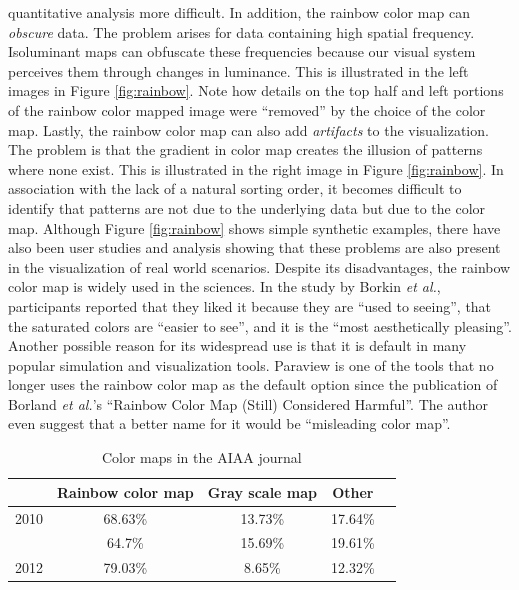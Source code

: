 quantitative analysis more difficult\cite{Borland:2007:RCM:1251554.1251614}.  
%
In addition, the rainbow color map can \emph{obscure} data. The problem arises 
for data containing high spatial frequency. Isoluminant maps can obfuscate these frequencies 
because our visual system perceives them through changes in luminance. 
%
This is illustrated in the left images in Figure \ref{fig:rainbow}.
%
Note how details on the top half and left portions of the rainbow color mapped image  were ``removed'' by the choice of the color map.
%
Lastly, the rainbow color map can also add \emph{artifacts} to the visualization\cite{treinishshould}. 
The problem is that the gradient in color map creates the illusion of patterns where none exist. This 
is illustrated in the right image in Figure \ref{fig:rainbow}. In association with the lack of a natural sorting order, 
it becomes difficult to identify that patterns are not due to the underlying data but due to the color map. 
%
Although Figure \ref{fig:rainbow} shows simple synthetic examples, there have also been user studies and 
analysis showing that these problems are also present in the visualization of real world scenarios\cite{treinishshould}.
%
Despite its disadvantages, the rainbow color map is widely used in the sciences. In the study by Borkin 
\emph{et al.}\cite{305}, participants reported that they liked it because they are ``used to seeing'', that 
the saturated colors are ``easier to see'', and it is the ``most aesthetically pleasing''. 
%
Another possible reason  for its widespread use is that it is default in many popular simulation and 
visualization tools. Paraview is one of the tools that no longer uses the rainbow color map as the
default option since the publication of  Borland \emph{et al.}'s ``Rainbow Color Map (Still) Considered 
Harmful''\cite{paraview}. The author even suggest that a better name for it would be ``misleading color map''.
%


\begin{table}[t]
\caption{Color maps in the AIAA journal} \label{table:aiaa_colormap}{}\centering
\begin{tabular}{lcccc}
				&  	Rainbow color map	 & Gray scale map & Other\\ \hline
	2010		&       68.63\%		   	 &        13.73\% & 17.64\%    		          \\
\gc	2011		& 		64.7\%		 	 &        15.69\%& 19.61\%      		     	  \\
	2012		&       79.03\% 	     &        8.65\% & 12.32\%        		      \\
\end{tabular}
\end{table}


